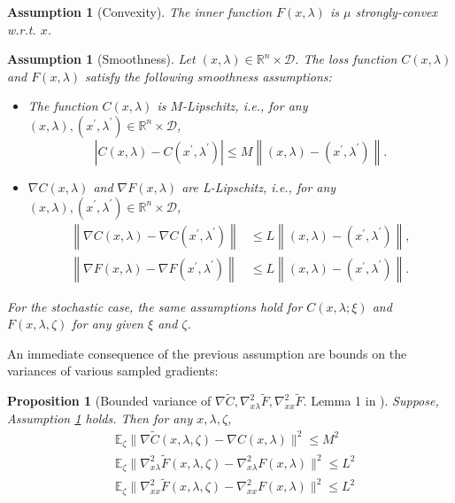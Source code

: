 \documentclass[11pt, twoside]{report}
\newtheorem{proposition}[theorem]{Proposition}
\newtheorem{assumption}[theorem]{Assumption}
\begin{document}
\begin{assumption}[Convexity] \label{conv_ass}
    The inner function $F(x, \lambda)$ is $\mu$ strongly-convex w.r.t. $x$.
\end{assumption}

\begin{assumption}[Smoothness] \label{smo_ass}
Let $(x,\lambda) \in \mathbb{R}^{n} \times \mathcal{D}$. The loss function $C(x,\lambda)$ and $F(x,\lambda)$ satisfy the following smoothness assumptions:
\begin{itemize}
    \item The function $C(x,\lambda)$ is $M$-Lipschitz, i.e., for any $(x,\lambda), (x^{\prime},\lambda^{\prime}) \in \mathbb{R}^{n} \times \mathcal{D}$,
$$
\left|C(x,\lambda)-C(x^{\prime},\lambda^{\prime})\right| \leq M\left\|(x,\lambda)-(x^{\prime},\lambda^{\prime})\right\| .
$$
    \item $\nabla C(x,\lambda)$ and $\nabla F(x,\lambda)$ are L-Lipschitz, i.e., for any $(x,\lambda), (x^{\prime},\lambda^{\prime}) \in \mathbb{R}^{n} \times \mathcal{D}$,
$$
\begin{aligned}
\left\|\nabla C(x,\lambda)-\nabla C(x^{\prime},\lambda^{\prime})\right\| & \leq L\left\|(x,\lambda)-(x^{\prime},\lambda^{\prime})\right\|, \\
\left\|\nabla F(x,\lambda)-\nabla F(x^{\prime},\lambda^{\prime})\right\| & \leq L\left\|(x,\lambda)-(x^{\prime},\lambda^{\prime})\right\| .
\end{aligned}
$$
\end{itemize}
For the stochastic case, the same assumptions hold for $C(x,\lambda ; \xi)$ and $F(x,\lambda, \zeta)$ for any given $\xi$ and $\zeta$.
\end{assumption}

An immediate consequence of the previous assumption are bounds on the variances of various sampled gradients:
\begin{proposition}[Bounded variance of $\nabla \tilde{C}, \nabla_{x\lambda}^2 \tilde{F},\nabla_{xx}^2 \tilde{F}$. Lemma 1 in \cite{ji2021bilevel}] \label{boun_var}
    Suppose, Assumption \ref{smo_ass} holds. Then for any $x,\lambda,\zeta$,
    \begin{align*}
        &\mathbb{E}_\zeta \|\nabla \tilde{C}(x,\lambda,\zeta) - \nabla C(x,\lambda)\|^2 \leq M^2 \\
        &\mathbb{E}_\zeta \|\nabla_{x\lambda}^2 \tilde{F}(x,\lambda,\zeta) - \nabla_{x\lambda}^2 F(x,\lambda)\|^2 \leq L^2 \\
        &\mathbb{E}_\zeta \|\nabla_{xx}^2 \tilde{F}(x,\lambda,\zeta) - \nabla_{xx}^2 F(x,\lambda)\|^2 \leq L^2 
    \end{align*}
\end{proposition}
\end{document}
